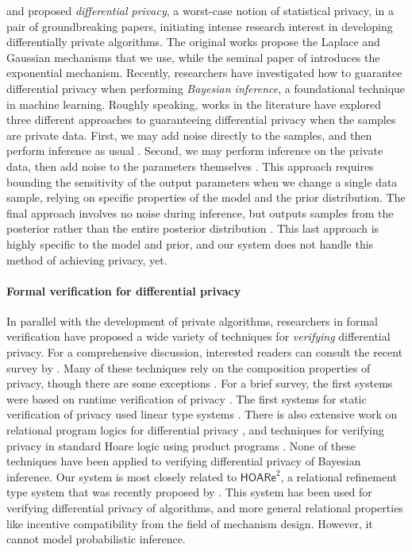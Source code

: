 \documentclass{sig-alternate-05-2015}
\theoremstyle{plain}
\theoremstyle{definition}
\theoremstyle{corollary}
\begin{document}
\citet{DBLP:conf/pods/BlumDMN05} and \citet{DMNS06} proposed \emph{differential privacy}, a
worst-case notion of statistical privacy, in a pair of groundbreaking papers,
initiating intense research interest in developing differentially private
algorithms. The original works propose the Laplace and Gaussian mechanisms that
we use, while the seminal paper of \citet{MT07} introduces the exponential
mechanism.
Recently, researchers have investigated how to guarantee differential privacy
when performing \emph{Bayesian inference}, a foundational technique in machine
learning. Roughly speaking, works in the literature have explored three different approaches to guaranteeing
differential privacy when the samples are private data. First, we may
add noise directly to the samples, and then perform inference as usual
\citep{DBLP:conf/nips/WilliamsM10}. Second, we may perform inference
on the private data, then add noise to the parameters themselves
\citep{ZhangRD16}. This approach requires bounding the sensitivity of the
output parameters when we change a single data sample, relying on
specific properties of the model and the prior distribution. The final
approach involves no noise during inference, but outputs samples from
the posterior rather than the entire posterior distribution
\citep{DimitrakakisNMR14,ZhangRD16,Zheng16}. This last approach is highly specific to the model and
prior, and our system does not handle this method of achieving
privacy, yet.




\paragraph*{Formal verification for differential privacy}

In parallel with the development of private algorithms, researchers in formal
verification have proposed a wide variety of techniques for \emph{verifying}
differential privacy. For a comprehensive discussion, interested readers can
consult the recent survey by \citet{Barthe:2016:PLT}. Many of these techniques rely on the composition
properties of privacy, though there are some exceptions \citep{BGGHS16}.  For a
brief survey, the first systems were based on runtime verification of privacy
\citep{PINQ09}. The first systems for static verification of privacy used linear
type systems \citep{ReedPierce10,GaboardiHHNP13}. There is also extensive work
on relational program logics for differential privacy
\citep{POPL:BKOZ12,DBLP:conf/csfw/BartheDGKB13,BartheO13}, and techniques for
verifying privacy in standard Hoare logic using product programs
\citep{BGGHKS14}. None of these techniques have been applied to verifying differential privacy of Bayesian inference.
Our system is most closely related to $\mathsf{HOARe}^2$, a relational
refinement type system that was recently proposed by \citet{BartheGAHRS15}. This
system has been used for verifying differential privacy of algorithms, and more
general relational properties like incentive compatibility from the field of
mechanism design. However, it cannot model probabilistic inference.
\end{document}
